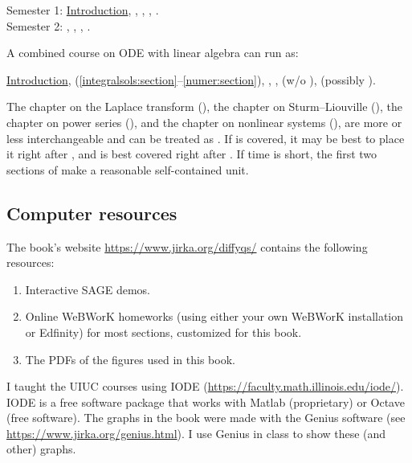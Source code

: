 \noindent
Semester 1:
\hyperref[intro:chapter]{Introduction},
,
,
,
.
\\
Semester 2: 
,
,
,
.

\medskip

A combined course on ODE with linear algebra can run as:

\medskip

\noindent
\hyperref[intro:chapter]{Introduction},
 (\ref{integralsols:section}--\ref{numer:section}),
,
,
 (w/o ), (possibly 
).

\medskip

The chapter on
the Laplace transform (),
the chapter on Sturm--Liouville (),
the chapter on power series (),
and the chapter on nonlinear systems (),
are more or less interchangeable and can be treated as .
If  is covered, it may be best to place it right 
after ,
and  is best covered right after
.
If time is short, the first two sections of
 make a reasonable self-contained unit.

\subsection{Computer resources}

The book's
website \url{https://www.jirka.org/diffyqs/}
contains the following resources:
\begin{enumerate}
\item Interactive SAGE demos.
\item Online WeBWorK homeworks
(using either your own WeBWorK installation or Edfinity)
for most sections, customized for this book.
\item The PDFs of the figures used in this book.
\end{enumerate}

I taught the UIUC courses using IODE
(\url{https://faculty.math.illinois.edu/iode/}).
IODE is a free software package that
works with Matlab (proprietary) or Octave (free software).
The graphs in the book were made with
the Genius software
(see \url{https://www.jirka.org/genius.html}).  I use Genius
in class to show these (and other) graphs.

